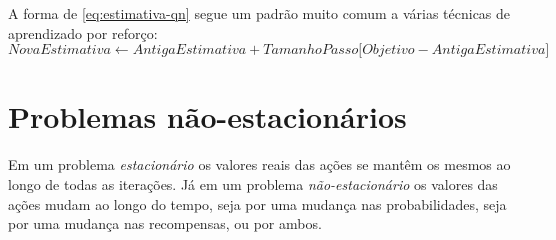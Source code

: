 \documentclass{article}
\begin{document}
        A forma de \eqref{eq:estimativa-qn} segue um padrão muito comum a várias técnicas de aprendizado por reforço:
        \begin{equation}
            NovaEstimativa \leftarrow AntigaEstimativa + TamanhoPasso \Big[ Objetivo - AntigaEstimativa \Big]
        \end{equation}
            
    \section{Problemas não-estacionários}

        Em um problema \emph{estacionário} os valores reais das ações se mantêm os mesmos ao longo de todas as iterações. Já em um problema \emph{não-estacionário} os valores das ações mudam ao longo do tempo, seja por uma mudança nas probabilidades, seja por uma mudança nas recompensas, ou por ambos.
        
\end{document}
